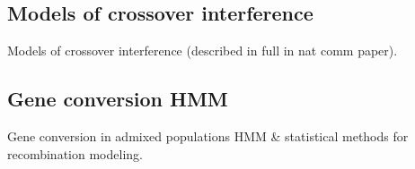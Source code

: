 \subsection{Models of crossover interference}
    Models of crossover interference (described in full in nat comm paper).

\subsection{Gene conversion HMM}
    Gene conversion in admixed populations HMM \& statistical methods for recombination modeling.


\renewcommand{\bibname}{References}
\begingroup
    \setlength{\bibsep}{10pt}
    \linespread{1}\selectfont
    
\endgroup

